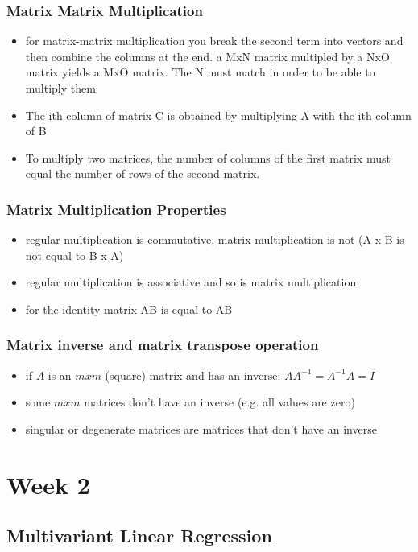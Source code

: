 \documentclass[11pt]{article}
\begin{document}
\subsubsection{Matrix Matrix Multiplication}
\label{sec:org475d5f4}
\begin{itemize}
\item for matrix-matrix multiplication you break the second term into
vectors and then combine the columns at the end. a MxN matrix
multipled by a NxO matrix yields a MxO matrix. The N must match in
order to be able to multiply them
\item The ith column of matrix C is obtained by multiplying A with the ith column of B
\item To multiply two matrices, the number of columns of the first matrix must equal the number of rows of the second matrix.
\end{itemize}
\subsubsection{Matrix Multiplication Properties}
\label{sec:orgcae5b2e}
\begin{itemize}
\item regular multiplication is commutative, matrix multiplication is not (A x B is not equal to B x A)
\item regular multiplication is associative and so is matrix multiplication
\item for the identity matrix AB is equal to AB
\end{itemize}
\subsubsection{Matrix inverse and matrix transpose operation}
\label{sec:org50ef47b}
\begin{itemize}
\item if \(A\) is an \(mxm\) (square) matrix and has an inverse: \(AA^{-1}=A^{-1}A=I\)
\item some \(mxm\) matrices don't have an inverse (e.g. all values are zero)
\item singular or degenerate matrices are matrices that don't have an inverse
\end{itemize}

\section{Week 2}
\label{sec:orgff97949}
\subsection{Multivariant Linear Regression}
\label{sec:orgd0a0d0d}
\end{document}
